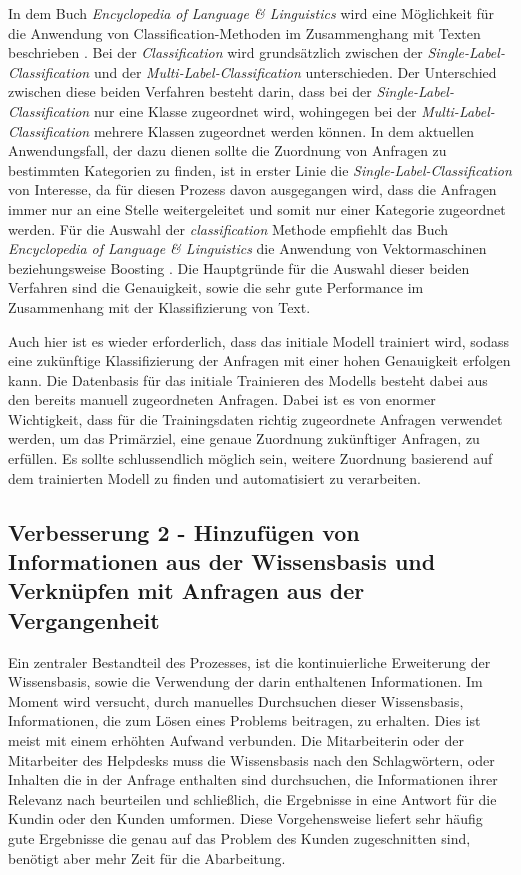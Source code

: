 In dem Buch \textit{Encyclopedia of Language \& Linguistics} wird eine Möglichkeit für die Anwendung von Classification-Methoden im Zusammenghang mit Texten beschrieben \cite{brown2006encyclopedia}. Bei der \textit{Classification} wird grundsätzlich zwischen der \textit{Single-Label-Classification} und der \textit{Multi-Label-Classification} unterschieden. Der Unterschied zwischen diese beiden Verfahren besteht darin, dass bei der \textit{Single-Label-Classification} nur eine Klasse zugeordnet wird, wohingegen bei der \textit{Multi-Label-Classification} mehrere Klassen zugeordnet werden können. In dem aktuellen Anwendungsfall, der dazu dienen sollte die Zuordnung von Anfragen zu bestimmten Kategorien zu finden, ist in erster Linie die \textit{Single-Label-Classification} von Interesse, da für diesen Prozess davon ausgegangen wird, dass die Anfragen immer nur an eine Stelle weitergeleitet und somit nur einer Kategorie zugeordnet werden. Für die Auswahl der  \textit{classification} Methode empfiehlt das Buch \textit{Encyclopedia of Language \& Linguistics} die Anwendung von Vektormaschinen beziehungsweise Boosting \cite{brown2006encyclopedia}. Die Hauptgründe für die Auswahl dieser beiden Verfahren sind die Genauigkeit, sowie die sehr gute Performance im Zusammenhang mit der Klassifizierung von Text. 

Auch hier ist es wieder erforderlich, dass das initiale Modell trainiert wird, sodass eine zukünftige Klassifizierung der Anfragen mit einer hohen Genauigkeit erfolgen kann. Die Datenbasis für das initiale Trainieren des Modells besteht dabei aus den bereits manuell zugeordneten Anfragen. Dabei ist es von enormer Wichtigkeit, dass für die Trainingsdaten richtig zugeordnete Anfragen verwendet werden, um das Primärziel, eine genaue Zuordnung zukünftiger Anfragen, zu erfüllen. Es sollte schlussendlich möglich sein, weitere Zuordnung basierend auf dem trainierten Modell zu finden und automatisiert zu verarbeiten.

\subsection{Verbesserung 2 - Hinzufügen von Informationen aus der Wissensbasis und Verknüpfen mit Anfragen aus der Vergangenheit}
\label{sec:improvement2}
Ein zentraler Bestandteil des Prozesses, ist die kontinuierliche Erweiterung der Wissensbasis, sowie die Verwendung der darin enthaltenen Informationen. Im Moment wird versucht, durch manuelles Durchsuchen dieser Wissensbasis, Informationen, die zum Lösen eines Problems beitragen, zu erhalten. Dies ist meist mit einem erhöhten Aufwand verbunden. Die Mitarbeiterin oder der Mitarbeiter des Helpdesks muss die Wissensbasis nach den Schlagwörtern, oder Inhalten die in der Anfrage enthalten sind durchsuchen, die Informationen ihrer Relevanz nach beurteilen und schließlich, die Ergebnisse in eine Antwort für die Kundin oder den Kunden umformen. Diese Vorgehensweise liefert sehr häufig gute Ergebnisse die genau auf das Problem des Kunden zugeschnitten sind, benötigt aber mehr Zeit für die Abarbeitung. 

